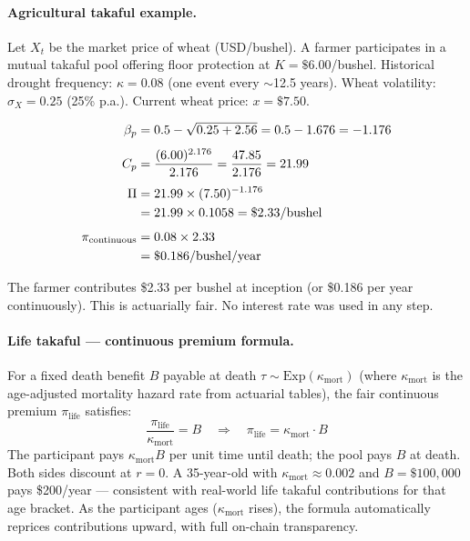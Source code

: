 \documentclass[10pt,twocolumn]{article}
\theoremstyle{plain}
\theoremstyle{definition}
\begin{document}
\paragraph{Agricultural takaful example.}
Let $X_t$ be the market price of wheat (USD/bushel). A farmer
participates in a mutual takaful pool offering floor protection
at $K = \$6.00$/bushel. Historical drought frequency:
$\kappa = 0.08$ (one event every $\sim$12.5 years).
Wheat volatility: $\sigma_X = 0.25$ (25\% p.a.).
Current wheat price: $x = \$7.50$.

\begin{align}
\beta_p &= 0.5 - \sqrt{0.25 + 2.56} = 0.5 - 1.676 = -1.176
\notag\\[4pt]
C_p &= \frac{(6.00)^{2.176}}{2.176}
= \frac{47.85}{2.176} = 21.99
\notag\\[4pt]
\Pi &= 21.99 \times (7.50)^{-1.176} \notag\\
    &= 21.99 \times 0.1058 = \$2.33\text{/bushel}
\label{eq:agri_example}\\[4pt]
\pi_\mathrm{continuous} &= 0.08 \times 2.33 \notag\\
&= \$0.186\text{/bushel/year}
\notag
\end{align}

The farmer contributes \$2.33 per bushel at inception (or
\$0.186 per year continuously). This is actuarially fair.
No interest rate was used in any step.

\paragraph{Life takaful --- continuous premium formula.}
For a fixed death benefit $B$ payable at death $\tau \sim
\mathrm{Exp}(\kappa_{\mathrm{mort}})$ (where $\kappa_{\mathrm{mort}}$
is the age-adjusted mortality hazard rate from actuarial tables),
the fair continuous premium $\pi_{\mathrm{life}}$ satisfies:
\begin{equation}
\frac{\pi_{\mathrm{life}}}{\kappa_{\mathrm{mort}}}
= B
\quad\Longrightarrow\quad
\pi_{\mathrm{life}} = \kappa_{\mathrm{mort}} \cdot B
\label{eq:life_takaful}
\end{equation}
The participant pays $\kappa_{\mathrm{mort}} B$ per unit time
until death; the pool pays $B$ at death. Both sides discount
at $r = 0$. A 35-year-old with $\kappa_{\mathrm{mort}} \approx
0.002$ and $B = \$100{,}000$ pays \$200/year --- consistent with
real-world life takaful contributions for that age bracket.
As the participant ages ($\kappa_{\mathrm{mort}}$ rises),
the formula automatically reprices contributions upward,
with full on-chain transparency.
\end{document}
